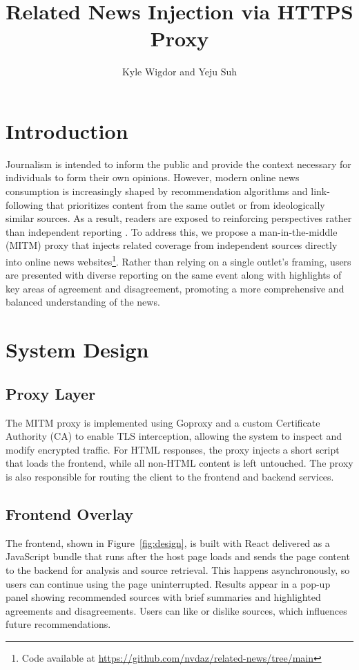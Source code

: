 \documentclass[11pt]{article}
\title{Related News Injection via HTTPS Proxy}
\author{Kyle Wigdor and Yeju Suh}
\date{}
\begin{document}
\maketitle

\section{Introduction}
Journalism is intended to inform the public and provide the context necessary for individuals to form their own opinions. However, modern online news consumption is increasingly shaped by recommendation algorithms and link-following that prioritizes content from the same outlet or from ideologically similar sources. As a result, readers are exposed to reinforcing perspectives rather than independent reporting \cite{bias}. To address this, we propose a man-in-the-middle (MITM) proxy that injects related coverage from independent sources directly into online news websites\footnote{Code available at \url{https://github.com/nvdaz/related-news/tree/main}}. Rather than relying on a single outlet's framing, users are presented with diverse reporting on the same event along with highlights of key areas of agreement and disagreement, promoting a more comprehensive and balanced understanding of the news.

\section{System Design}

\subsection{Proxy Layer}
The MITM proxy is implemented using Goproxy \cite{goproxy} and a custom Certificate Authority (CA) to enable TLS interception, allowing the system to inspect and modify encrypted traffic. For HTML responses, the proxy injects a short script that loads the frontend, while all non-HTML content is left untouched. The proxy is also responsible for routing the client to the frontend and backend services.

\subsection{Frontend Overlay}
The frontend, shown in Figure~\ref{fig:design}, is built with React \cite{react} delivered as a JavaScript bundle that runs after the host page loads and sends the page content to the backend for analysis and source retrieval. This happens asynchronously, so users can continue using the page uninterrupted. Results appear in a pop-up panel showing recommended sources with brief summaries and highlighted agreements and disagreements. Users can like or dislike sources, which influences future recommendations.
\end{document}
